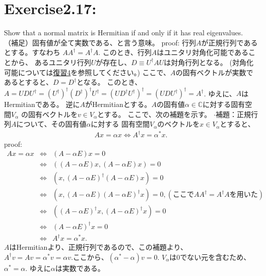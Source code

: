 \section{\Large Exercise2.17:} Show that a normal matrix is
Hermitian if and only if it has real eigenvalues.
\newline
（補足）固有値が全て実数である、と言う意味。
\newline
{\large proof:}
行列$A$が正規行列であるとする。すなわち
$AA^\dagger = A^\dagger A$.
このとき、行列$A$はユニタリ対角化可能であることから、
あるユニタリ行列$U$が存在し、$D \equiv U^\dagger AU$は対角行列となる。
(対角化可能については\hyperlink{hukushuu4}{復習4}を参照してください。)
ここで、$A$の固有ベクトルが実数であるとすると、$D = D^\dagger$となる。
このとき、$A = UDU^\dagger = (U^\dagger)^\dagger (D^\dagger)^\dagger U^\dagger = (U D^\dagger U^\dagger)^\dagger
= (U D U^\dagger)^\dagger = A^\dagger$.
ゆえに、$A$はHermitianである。
\newline
逆に$A$がHermitianとする。$A$の固有値$\alpha \in \mathbb{C}$に対する固有空間$V_\alpha$
の固有ベクトルを$v \in V_\alpha$とする。
ここで、次の補題を示す。
\newline
\color{blue}
\hypertarget{hodai.ex2.17}{}
$\cdot$補題：正規行列$A$について、その固有値$\alpha$に対する
固有空間$V_\alpha$のベクトルを$x \in V_\alpha$とすると、
\begin{eqnarray*}
Ax = \alpha x \Leftrightarrow A^\dagger x = \alpha^* x.
\end{eqnarray*}
{proof:}
\begin{eqnarray*}
Ax = \alpha x &\Leftrightarrow& (A - \alpha E)x = 0\\
&\Leftrightarrow& ((A - \alpha E)x ,(A - \alpha E)x) = 0\\
&\Leftrightarrow& (x ,(A - \alpha E)^\dagger (A - \alpha E)x) = 0\\
&\Leftrightarrow& (x ,(A - \alpha E) (A - \alpha E)^\dagger x) = 0, (ここでAA^\dagger = A^\dagger Aを用いた)\\
&\Leftrightarrow& ((A - \alpha E)^\dagger x ,(A - \alpha E)^\dagger x) = 0\\
&\Leftrightarrow& (A - \alpha E)^\dagger x = 0\\
&\Leftrightarrow& A^\dagger x = \alpha^*x.
\end{eqnarray*}
\newline
\color{black}
$A$はHermitianより、正規行列であるので、この補題より、
$A^\dagger v = A v = \alpha^* v = \alpha v.$ここから、$(\alpha^* - \alpha) v = 0.$
$V_\alpha$は0でない元を含むため、$\alpha^* = \alpha$.
ゆえに$\alpha$は実数である。
